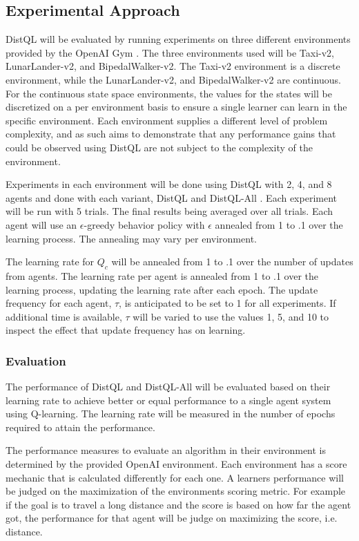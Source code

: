 \documentclass[jair,twoside,11pt,theapa]{article}
\begin{document}
\subsection{Experimental Approach}
\label{experiments}
DistQL will be evaluated by running experiments on three different environments provided by the OpenAI Gym \cite{gym}.
The three environments used will be Taxi-v2, LunarLander-v2, and BipedalWalker-v2. The Taxi-v2 environment is a discrete 
environment, while the LunarLander-v2, and BipedalWalker-v2 are continuous. For the continuous state space environments, 
the values for the states will be discretized on a per environment basis to ensure a single learner can learn in the specific environment. 
Each environment supplies a different level of problem complexity, and as such aims to demonstrate that any performance gains that could
be observed using DistQL are not subject to the complexity of the environment.

Experiments in each environment will be done using DistQL with 2, 4, and 8 agents and done with each variant, DistQL and DistQL-All . Each experiment will be run with 5 trials. The final results
being averaged over all trials. Each agent will use an $\epsilon$-greedy behavior policy with $\epsilon$ annealed from 1 to .1 over the learning process. The annealing may vary per environment. 

The learning rate for $Q_c$ will be annealed from 1 to .1 over the number of updates from agents. The learning rate per agent is annealed from 1 to .1 over the learning process, updating the learning rate after each epoch. The update frequency for each agent, $\tau$, is anticipated to be set to 1 for all experiments. If additional time is available, $\tau$ will be varied 
to use the values 1, 5, and 10 to inspect the effect that update frequency has on learning. 

\subsubsection{Evaluation}
The performance of DistQL and DistQL-All will be evaluated based on their learning rate to achieve better or equal performance to a single agent system using Q-learning. 
The learning rate will be measured in the number of epochs required to attain the performance. 

The performance measures to evaluate an algorithm in their environment is determined by the provided OpenAI environment. Each environment has a score mechanic that is calculated
differently for each one. A learners performance will be judged on the maximization of the environments scoring metric. For example if the goal is to travel a long distance and the score 
is based on how far the agent got, the performance for that agent will be judge on maximizing the score, i.e. distance. 
\end{document}
